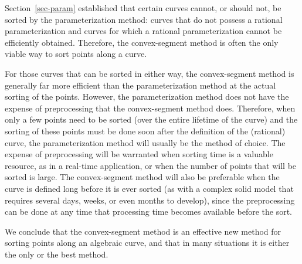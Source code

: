 Section~\ref{sec-param} established that certain curves cannot, or should
not, be sorted by the parameterization method: curves that 
do not possess a rational parameterization and curves for which
a rational parameterization cannot be efficiently obtained.
Therefore, the convex-segment method is often 
the only viable way to sort points along a curve.

For those curves that can be sorted in either way, 
the convex-segment method is generally far more
efficient than the parameterization method at the actual sorting of the 
points.
However, the parameterization method does not have the expense of 
preprocessing that the convex-segment method does.
Therefore, when only a few points need to be sorted 
(over the entire lifetime of the curve) and the sorting of these points
must be done soon after the definition of the (rational) curve,
the parameterization method will usually be the method of choice.
The expense of preprocessing will be warranted when
sorting time is a valuable resource, as in a real-time application,
or when the number of points that will be sorted is large.
The convex-segment method will also be preferable 
when the curve is defined long before it is ever sorted
(as with a complex solid model that requires several days, weeks, or even
months to 
develop), since the preprocessing can be done at any time
that processing time becomes available  before the sort.

We conclude that the convex-segment method is an effective new method for
sorting points along an algebraic curve, and that in many situations it is 
either the only or the best method.


